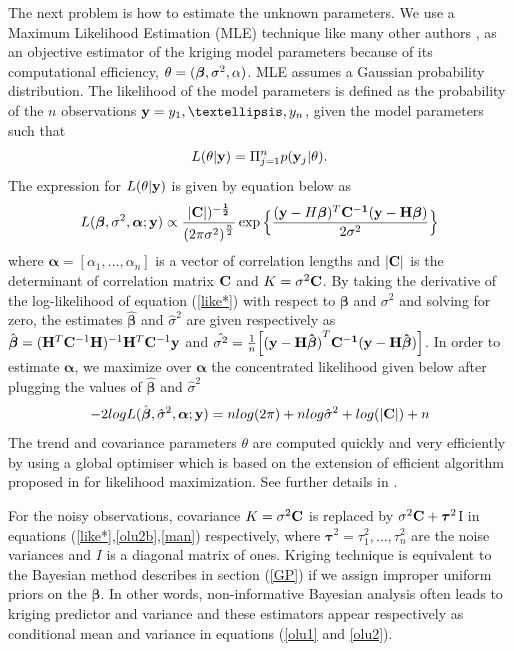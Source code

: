 \documentclass[12pt,titlepage]{report}
\newcommand{\bH}{{\bf H}}
\newcommand{\bC}{{\bf C}}
\newcommand{\by}{{\bf y}}
\newcommand{\bbeta}{{\boldsymbol{\beta}}}
\newcommand{\hbbeta}{{\hat{\boldsymbol{\beta}}}}
\newcommand{\btau}{{{\boldsymbol{\tau}}}}
\newcommand{\balpha}{{\boldsymbol{\alpha}}}
\theoremstyle{definition}
\theoremstyle{remark}
\begin{document}
The next problem is how to estimate the unknown parameters. We use a Maximum Likelihood Estimation (MLE) technique like many other authors \citep{ pd5,pd28}, as an objective estimator of the kriging model parameters because of its computational efficiency, $\theta=(\bbeta,\sigma^2,\boldmath \alpha)$. MLE assumes a Gaussian probability distribution. 
The likelihood of the model parameters is defined as the probability of the $n$ observations $\by= {y_1, …, y_n}$, given the model parameters such that 
\begin{equation}
L(\theta|\by)= \Pi_{j=1}^n p(\by_j|\theta).
\end{equation}
The expression for $L(\theta|\by)$ is given by equation below as
\begin{equation}\label{like*}
L(\boldsymbol \beta, \sigma^2, \boldsymbol{\alpha};\by)\propto \frac{|\bf C|)^{-\frac{1}{2}}}{{(2\pi\sigma^2)}^\frac{n}{2}}\exp \Big \{\frac{(\by-H\boldsymbol \beta)^T \bf C^{-1}(\by-H\boldsymbol \beta)}{2\sigma^2}\Big\}
\end{equation}
where $\boldsymbol{\alpha}=[\alpha_1, \ldots, \alpha_n]$ is a vector of correlation lengths and $|\bC|$ is the determinant of correlation matrix $\bC$ and $K = \sigma^2\bC$.
By taking the derivative of the log-likelihood of equation (\ref{like*}) with
respect to $\bbeta$ and $\sigma^2$ and solving for zero, the estimates $\hbbeta$ and $\hat\sigma^2$ are given respectively as $\hbbeta=(\bH^T\bC^{-1}\bH)^{-1}\bH^T\bC^{-1}\by$ and $\hat{\sigma^2}=\frac{1}{n}\Big[\mathbf{(y-H\hat{\boldsymbol \beta})}^T\bf C^{-1}(\bf y-H\hat{\boldsymbol \beta})\Big]$. In order to estimate $\balpha$, we maximize over $\balpha$ the concentrated likelihood given below after plugging the values of $\hbbeta$ and $\hat\sigma^2$
\begin{equation}
-2 log L(\hbbeta, \hat \sigma^2, \balpha; \by) = n log(2\pi) + n log\hat \sigma^2 + log(|\bC|) + n
\end{equation}
The trend and covariance parameters $\theta$ are computed quickly and very efficiently by using a global optimiser which is based on the extension of efficient algorithm proposed in \cite{pd9} for likelihood maximization. See further details in \citep{pd8}.

For the noisy observations, covariance $K=\sigma^2\bC$ is replaced by $ \sigma^2\bC+\btau^2$I in equations (\ref{like*},\ref{olu2b},\ref{man}) respectively, where $\btau^2=\tau^2_1,\ldots,\tau^2_n$ are the noise variances and $I$ is a diagonal matrix of ones. Kriging technique is equivalent to the Bayesian method describes in section (\ref{GP}) if we assign improper uniform priors on the $\bbeta$. In other words, non-informative Bayesian analysis often leads to kriging predictor and variance and these estimators appear respectively as conditional mean and variance in equations (\ref{olu1} and \ref{olu2}).
\end{document}

